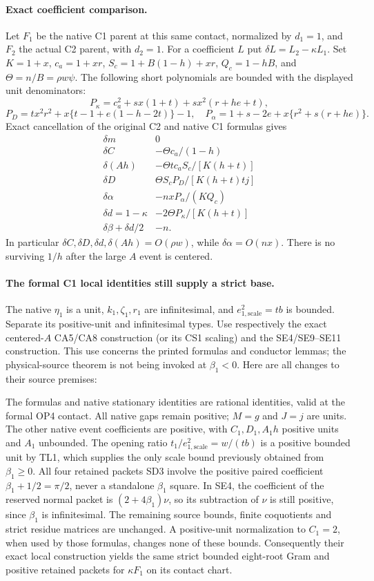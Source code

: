 \paragraph{Exact coefficient comparison.}
Let $F_1$ be the native C1 parent at this same contact, normalized by
$d_1=1$, and $F_2$ the actual C2 parent, with $d_2=1$.
For a coefficient $L$ put $\delta L=L_2-\kappa L_1$.
Set $K=1+x$, $c_a=1+xr$, $S_c=1+B(1-h)+xr$, $Q_c=1-hB$,
and $\Theta=n/B=\rho w\psi$. The following short polynomials are
bounded with the displayed unit denominators:
\[
 P_\kappa=c_a^2+sx(1+t)+sx^2(r+he+t),
\]
\[
 P_D=tx^2r^2+x\{t-1+e(1-h-2t)\}-1,\quad
 P_\alpha=1+s-2e+x\{r^2+s(r+he)\}.
\]
Exact cancellation of the original C2 and native C1 formulas gives
\[
\begin{array}{c|l}
 \delta m&0\\
 \delta C&-\Theta c_a/(1-h)\\
 \delta(Ah)&-\Theta t c_aS_c/[K(h+t)]\\
 \delta D&\Theta S_cP_D/[K(h+t)tj]\\
 \delta\alpha&-nxP_\alpha/(KQ_c)\\
 \delta d=1-\kappa&-2\Theta P_\kappa/[K(h+t)]\\
 \delta\beta+\delta d/2&-n.
\end{array}
\tag{TL3}
\]
In particular $\delta C,\delta D,\delta d,\delta(Ah)=O(\rho w)$,
while $\delta\alpha=O(nx)$. There is no surviving $1/h$ after the
large $A$ event is centered.

\paragraph{The formal C1 local identities still supply a strict base.}
The native $\eta_1$ is a unit, $k_1,\zeta_1,r_1$ are infinitesimal,
and $e_{1,\mathrm{scale}}^2=tb$ is bounded. Separate its positive-unit
and infinitesimal types. Use respectively the exact centered-$A$
CA5/CA8 construction (or its CS1 scaling) and the SE4/SE9--SE11
construction. This use concerns the printed formulas and conductor
lemmas; the physical-source theorem is not being invoked at $\beta_1<0$.
Here are all changes to their source premises:

The formulas and native stationary identities are rational identities,
valid at the formal OP4 contact. All native gaps remain positive; $M=g$
and $J=j$ are units. The other native event coefficients are positive,
with $C_1,D_1,A_1h$ positive units and $A_1$ unbounded. The opening
ratio $t_1/e_{1,\mathrm{scale}}^2=w/(tb)$ is a positive bounded unit
by TL1, which supplies the only scale bound previously obtained from
$\beta_1\ge0$. All four retained packets SD3 involve the positive
paired coefficient $\beta_1+1/2=\pi/2$, never a standalone
$\beta_1$ square. In SE4, the coefficient of the reserved normal packet
is $(2+4\beta_1)\nu$, so its subtraction of $\nu$ is still positive,
since $\beta_1$ is infinitesimal. The remaining source bounds, finite
coquotients and strict residue matrices are unchanged. A positive-unit
normalization to $C_1=2$, when used by those formulas, changes none of
these bounds. Consequently their exact local construction yields the
same strict bounded eight-root Gram and positive retained packets for
$\kappa F_1$ on its contact chart.

